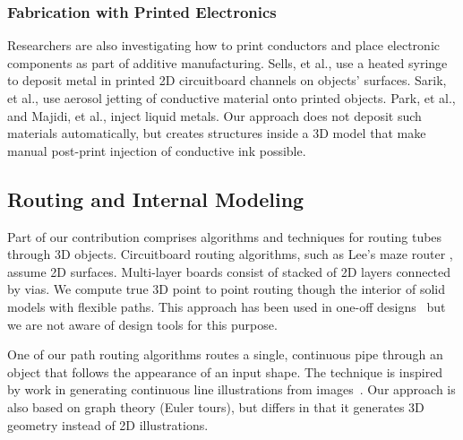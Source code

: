 \subsubsection{Fabrication with Printed Electronics}
Researchers are also investigating how to print conductors and place electronic components as part of additive manufacturing.  Sells, et al., \cite{Sells-reprap} use a heated syringe to deposit metal in printed 2D circuitboard channels on objects' surfaces.  Sarik, et al., \cite{Sarik-tracebrush} use aerosol jetting of conductive material onto printed objects.  Park, et al., \cite{Park-microchannels} and Majidi, et al., \cite{Majidi-curvature} inject liquid metals. Our approach does not deposit such materials automatically, but creates structures inside a 3D model that make manual post-print injection of conductive ink possible. 

\subsection{Routing and Internal Modeling}
Part of our contribution comprises algorithms and techniques for routing tubes through 3D objects.
Circuitboard routing algorithms, such as Lee's maze router \cite{Lee-maze}, assume 2D surfaces. Multi-layer boards consist of stacked of 2D layers connected by vias. We compute true 3D point to point routing though the interior of solid models with flexible paths. This approach has been used in one-off designs~\cite{Navarrette-gps} but we are not aware of design tools for this purpose.

One of our path routing algorithms routes a single, continuous pipe through an object that follows the appearance of an input shape. The technique is inspired by work in generating continuous line illustrations from images~\cite{Wong-continuousline,Bosch-tsp}. Our approach is also based on graph theory (Euler tours), but differs in that it generates 3D geometry instead of 2D illustrations.

